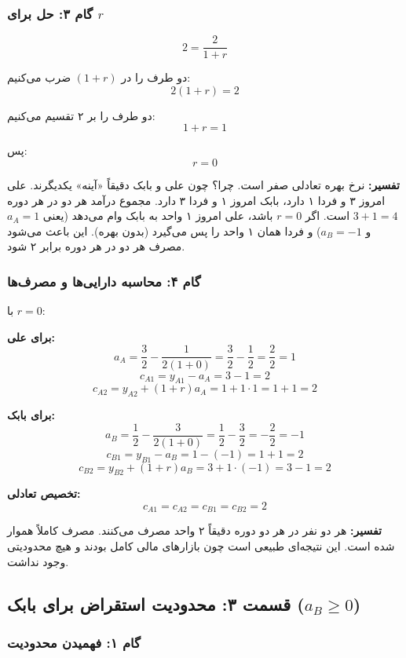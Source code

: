 \documentclass[12pt,a4paper]{article}
\begin{document}
\subsubsection{گام ۳: حل برای $r$}

\[
	2 = \frac{2}{1+r}
\]

دو طرف را در $(1+r)$ ضرب می‌کنیم:
\[
	2(1+r) = 2
\]

دو طرف را بر ۲ تقسیم می‌کنیم:
\[
	1+r = 1
\]

پس:
\[
	\boxed{r = 0}
\]

\textbf{تفسیر:} نرخ بهره تعادلی صفر است. چرا؟ چون علی و بابک دقیقاً «آینه» یکدیگرند. علی امروز ۳ و فردا ۱ دارد، بابک امروز ۱ و فردا ۳ دارد. مجموع درآمد هر دو در هر دوره $3+1 = 4$ است. اگر $r=0$ باشد، علی امروز ۱ واحد به بابک وام می‌دهد (یعنی $a_A = 1$ و $a_B = -1$) و فردا همان ۱ واحد را پس می‌گیرد (بدون بهره). این باعث می‌شود مصرف هر دو در هر دوره برابر ۲ شود.

\subsubsection{گام ۴: محاسبه دارایی‌ها و مصرف‌ها}

با $r=0$:

\textbf{برای علی:}
\[
	a_A = \frac{3}{2} - \frac{1}{2(1+0)} = \frac{3}{2} - \frac{1}{2} = \frac{2}{2} = 1
\]
\[
	c_{A1} = y_{A1} - a_A = 3 - 1 = 2
\]
\[
	c_{A2} = y_{A2} + (1+r) a_A = 1 + 1 \cdot 1 = 1 + 1 = 2
\]

\textbf{برای بابک:}
\[
	a_B = \frac{1}{2} - \frac{3}{2(1+0)} = \frac{1}{2} - \frac{3}{2} = -\frac{2}{2} = -1
\]
\[
	c_{B1} = y_{B1} - a_B = 1 - (-1) = 1 + 1 = 2
\]
\[
	c_{B2} = y_{B2} + (1+r) a_B = 3 + 1 \cdot (-1) = 3 - 1 = 2
\]

\textbf{تخصیص تعادلی:}
\[
	\boxed{c_{A1} = c_{A2} = c_{B1} = c_{B2} = 2}
\]

\textbf{تفسیر:} هر دو نفر در هر دو دوره دقیقاً ۲ واحد مصرف می‌کنند. مصرف کاملاً هموار شده است. این نتیجه‌ای طبیعی است چون بازارهای مالی کامل بودند و هیچ محدودیتی وجود نداشت.

\subsection{قسمت ۳: محدودیت استقراض برای بابک ($a_B \geq 0$)}

\subsubsection{گام ۱: فهمیدن محدودیت}
\end{document}
